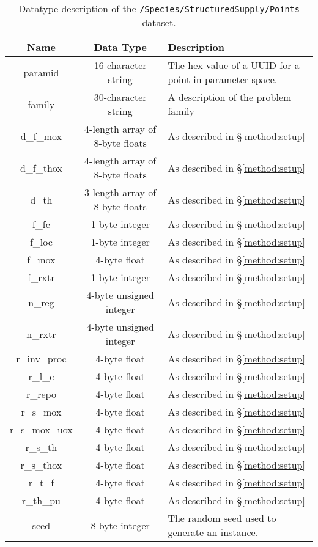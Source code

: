 \begin{table}[h!]
\centering
\label{tbl:/Species/StructuredSupply/Points}
\caption{Datatype description of the \lstinline[basicstyle=\ttfamily\color{black}]|/Species/StructuredSupply/Points| dataset.}
\begin{tabularx}{\columnwidth-10pt}{|c|c|X|} %
\hline
\textbf{Name} & \textbf{Data Type} & \textbf{Description}       \\ \hline
paramid & 16-character string & The hex value of a UUID for a point in parameter space. \\ \hline
family & 30-character string & A description of the problem family \\ \hline
d\_f\_mox & 4-length array of 8-byte floats & As described in \S \ref{method:setup} \\ \hline
d\_f\_thox & 4-length array of 8-byte floats & As described in \S \ref{method:setup} \\ \hline
d\_th & 3-length array of 8-byte floats & As described in \S \ref{method:setup} \\ \hline
f\_fc & 1-byte integer & As described in \S \ref{method:setup} \\ \hline
f\_loc & 1-byte integer & As described in \S \ref{method:setup} \\ \hline
f\_mox & 4-byte float & As described in \S \ref{method:setup} \\ \hline
f\_rxtr & 1-byte integer & As described in \S \ref{method:setup} \\ \hline
n\_reg & 4-byte unsigned integer & As described in \S \ref{method:setup} \\ \hline
n\_rxtr & 4-byte unsigned integer & As described in \S \ref{method:setup} \\ \hline
r\_inv\_proc & 4-byte float & As described in \S \ref{method:setup} \\ \hline
r\_l\_c & 4-byte float & As described in \S \ref{method:setup} \\ \hline
r\_repo & 4-byte float & As described in \S \ref{method:setup} \\ \hline
r\_s\_mox & 4-byte float & As described in \S \ref{method:setup} \\ \hline
r\_s\_mox\_uox & 4-byte float & As described in \S \ref{method:setup} \\ \hline
r\_s\_th & 4-byte float & As described in \S \ref{method:setup} \\ \hline
r\_s\_thox & 4-byte float & As described in \S \ref{method:setup} \\ \hline
r\_t\_f & 4-byte float & As described in \S \ref{method:setup} \\ \hline
r\_th\_pu & 4-byte float & As described in \S \ref{method:setup} \\ \hline
seed & 8-byte integer & The random seed used to generate an instance. \\ \hline
\end{tabularx}
\end{table}

